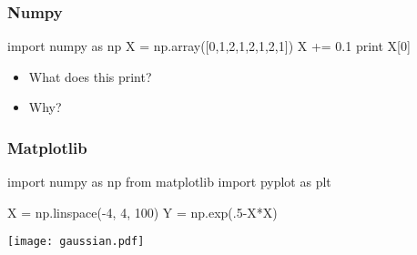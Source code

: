 \begin{frame}[fragile]
\frametitle{Numpy}

\begin{python}
import numpy as np
X = np.array([0,1,2,1,2,1,2,1])
X += 0.1
print X[0]
\end{python}

\begin{itemize}
\item What does this print?
\item Why?
\end{itemize}
\end{frame}


\begin{frame}[fragile]
\frametitle{Matplotlib}

\begin{python}
import numpy as np
from matplotlib import pyplot as plt

X = np.linspace(-4, 4, 100)
Y = np.exp(.5-X*X)
\end{python}

\centering
\texttt{[image: gaussian.pdf]}

\end{frame}




